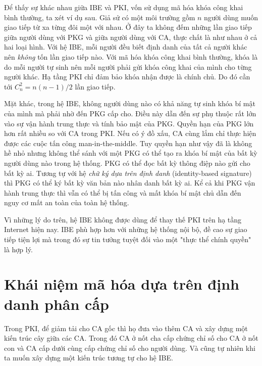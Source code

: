 \documentclass[class=report, crop=false]{standalone}
\begin{document}
		Để thấy sự khác nhau giữa IBE và PKI, vốn sử dụng mã hóa khóa công khai bình thường, ta xét ví dụ sau. Giả sử có một môi trường gồm $n$ người dùng muốn giao tiếp từ xa từng đôi một với nhau. Ở đây ta không đếm những lần giao tiếp giữa người dùng với PKG và giữa người dùng với CA, thực chất là như nhau ở cả hai loại hình. Với hệ IBE, mỗi người đều biết định danh của tất cả người khác nên \emph{không} tốn lần giao tiếp nào. Với mã hóa khóa công khai bình thường, khóa là do mỗi người tự sinh nên mỗi người phải gửi khóa công khai của mình cho từng người khác. Hạ tầng PKI chỉ đảm bảo khóa nhận được là chính chủ. Do đó cần tới $C_n^2 = n(n-1)/2$ lần giao tiếp.

		Mặt khác, trong hệ IBE, không người dùng nào có khả năng tự sinh khóa bí mật của mình mà phải nhờ đến PKG cấp cho. Điều này dẫn đến sự phụ thuộc rất lớn vào sự vận hành trung thực và tính bảo mật của PKG. Quyền hạn của PKG lớn hơn rất nhiều so với CA trong PKI. Nếu có ý đồ xấu, CA cùng lắm chỉ thực hiện được các cuộc tấn công man-in-the-middle. Tuy quyền hạn như vậy đã là không hề nhỏ nhưng không thể sánh với một PKG có thể tạo ra khóa bí mật của bất kỳ người dùng nào trong hệ thống. PKG có thể đọc bất kỳ thông điệp nào gửi cho bất kỳ ai. Tương tự với hệ \textit{chữ ký dựa trên định danh} (identity-based signature) thì PKG có thể ký bất kỳ văn bản nào nhân danh bất kỳ ai. Kể cả khi PKG vận hành trung thực thì vẫn có thể bị tấn công và mất khóa bí mật chủ dẫn đến nguy cơ mất an toàn của toàn hệ thống.

		Vì những lý do trên, hệ IBE không được dùng để thay thế PKI trên hạ tầng Internet hiện nay. IBE phù hợp hơn với những hệ thống nội bộ, đề cao sự giao tiếp tiện lợi mà trong đó sự tin tưởng tuyệt đối vào một "thực thể chính quyền" là hợp lý.
	\section{Khái niệm mã hóa dựa trên định danh phân cấp}
		Trong PKI, để giảm tải cho CA gốc thì họ đưa vào thêm CA và xây dựng một kiến trúc cây giữa các CA. Trong đó CA ở nốt cha cấp chứng chỉ số cho CA ở nốt con và CA cấp dưới cùng cấp chứng chỉ số cho người dùng. Và cũng tự nhiên khi ta muốn xây dựng một kiến trúc tương tự cho hệ IBE.
\end{document}
